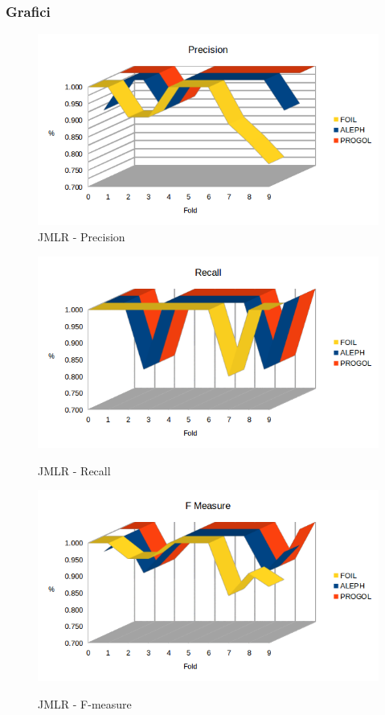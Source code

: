 \subsubsection{Grafici}
\begin{figure}[H]
	\includegraphics[width=1.1\textwidth]{img/datasetGraph/jmlr/precision.png}
	\caption{JMLR - Precision}
	\label{JMLR-Precision}
\end{figure}

\begin{figure}[H]
	\includegraphics[width=1.1\textwidth]{img/datasetGraph/jmlr/recall.png}
	\label{JMLR-Recall}
	\caption{JMLR - Recall}
\end{figure}

\begin{figure}[H]
	\includegraphics[width=1.1\textwidth]{img/datasetGraph/jmlr/fm.png}
	\label{JMLR-F-measure}
	\caption{JMLR - F-measure}
\end{figure}

